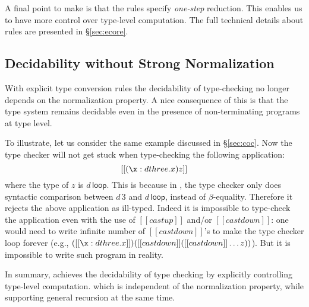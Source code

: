 A final point to make is that the \cast rules specify \emph{one-step}
reduction. This enables us to have more control over type-level
computation. The full technical details about \cast rules are presented
in \S\ref{sec:ecore}.

\subsection{Decidability without Strong Normalization}

With explicit type conversion rules the decidability of type-checking 
no longer depends on the normalization property. 
A nice consequence of this is that the type system remains decidable
even in the presence of non-terminating programs at type level.

To illustrate, let us consider the same example discussed in
\S\ref{sec:coc}. Now the type checker will not get stuck when
type-checking the following application:
\[ [[(\x: d three.x)z]] \]
where the type of $z$ is $d\,\mathsf{loop}$.  This is because in
\name, the type checker only does syntactic comparison between $d\,3$
and $d\,\mathsf{loop}$, instead of $\beta$-equality. Therefore it
rejects the above application as ill-typed. Indeed it is impossible to
type-check the application even with the use of $[[castup]]$ and/or
$[[castdown]]$: one would need to write infinite number of
$[[castdown]]$'s to make the type checker loop forever (e.g.,
$([[\x:d three.x]])([[castdown]]([[castdown]] \dots z))$). But it is
impossible to write such program in reality.

In summary, \name achieves the decidability of type checking by
explicitly controlling type-level computation.  which is independent
of the normalization property, while supporting general recursion at
the same time.

